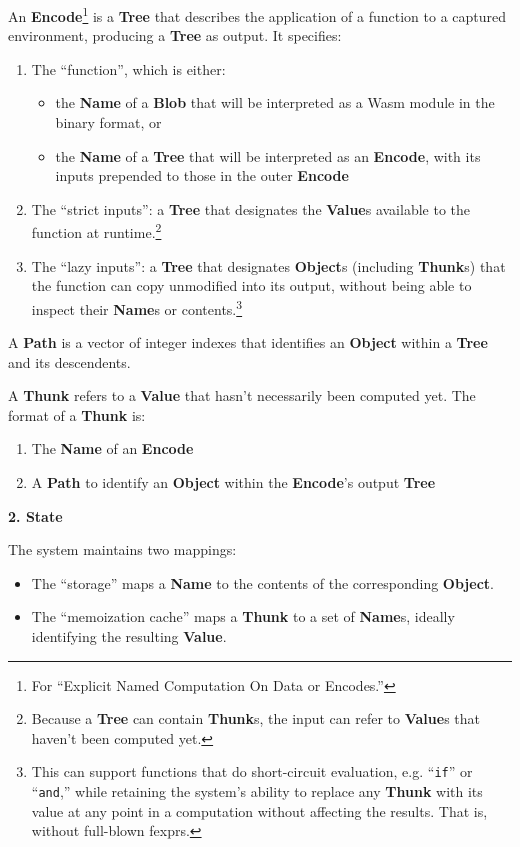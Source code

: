 \documentclass{article}
\newcommand{\blob}{\textbf{Blob}\xspace}
\newcommand{\valuex}{\textbf{Value}\xspace}
\newcommand{\valuexs}{\textbf{Value}s\xspace}
\newcommand{\object}{\textbf{Object}\xspace}
\newcommand{\objects}{\textbf{Object}s\xspace}
\newcommand{\encode}{\textbf{Encode}\xspace}
\newcommand{\thunk}{\textbf{Thunk}\xspace}
\newcommand{\thunks}{\textbf{Thunk}s\xspace}
\newcommand{\name}{\textbf{Name}\xspace}
\newcommand{\names}{\textbf{Name}s\xspace}
\newcommand{\tree}{\textbf{Tree}\xspace}
\newcommand{\pathx}{\textbf{Path}\xspace}
\begin{document}
An \encode\footnote{For ``Explicit Named Computation On Data or
  Encodes.''} is a \tree that describes the application of a function
to a captured environment, producing a \tree as output. It specifies:
\begin{enumerate}[topsep=0pt]

\item The ``function'', which is either:
\begin{itemize}[topsep=0pt]
\item the \name of a \blob that will be interpreted as a Wasm module in the binary format, or
\item the \name of a \tree that will be interpreted as an \encode, with its inputs prepended to those in the outer \encode
\end{itemize}

\item The ``strict inputs'': a \tree that designates the
  \valuexs available to the function at runtime.\footnote{Because a
    \tree can contain \thunks, the input can refer to \valuexs that haven't been computed yet.}
  
\item The ``lazy inputs'': a \tree that designates \objects
  (including \thunks) that the function can copy unmodified into its
  output, without being able to inspect their \names or contents.\footnote{This can support
    functions that do short-circuit evaluation, e.g. ``\texttt{if}''
    or ``\texttt{and},'' while retaining the system's ability to
    replace any \thunk with its value at any point in a
    computation without affecting the results. That is, without
    full-blown fexprs.}
\end{enumerate}

A \pathx is a vector of integer indexes that identifies an \object
within a \tree and its descendents.

\enlargethispage{\baselineskip}

A \thunk refers to a \valuex that hasn't necessarily been computed yet. The format of a \thunk is:
\begin{enumerate}[topsep=0pt]
\item The \name of an \encode
\item A \pathx to identify an \object within the \encode's output \tree
  \end{enumerate}

{\Large \textbf{2. State}}

The system maintains two mappings:
\begin{itemize}[topsep=0pt]
\item The ``storage'' maps a \name to the contents of the corresponding \object.

\item The ``memoization cache'' maps a \thunk to a set of \names, ideally identifying the resulting \valuex.
\end{itemize}
  
\end{document}
